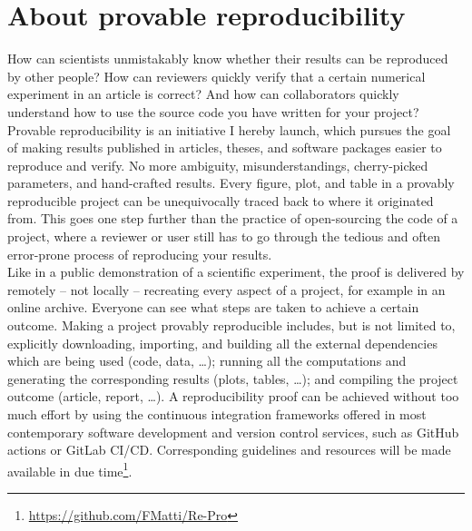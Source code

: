 \chapter*{About provable reproducibility}
\label{chp:0-reproducibility}

How can scientists unmistakably know whether their results can be reproduced
by other people? How can reviewers quickly verify that a certain numerical
experiment in an article is correct? And how can collaborators quickly
understand how to use the source code you have written for your project?\\

Provable reproducibility is an initiative I hereby launch, which pursues the
goal of making results published in articles, theses, and software packages easier to
reproduce and verify. No more ambiguity, misunderstandings, cherry-picked
parameters, and hand-crafted results. Every figure, plot, and table
in a provably reproducible project can be unequivocally traced back to where
it originated from. This goes one step further than the practice of open-sourcing
the code of a project, where a reviewer or user still has to go through the
tedious and often error-prone process of reproducing your results.\\

Like in a public demonstration of a scientific experiment, the proof is delivered
by remotely -- not locally -- recreating every aspect of a project, for example
in an online archive. Everyone can see what steps are taken to achieve a certain outcome.
Making a project provably reproducible includes, but is not limited to,
explicitly downloading, importing, and building all the external dependencies which are being used (code, data, \dots);
running all the computations and generating the corresponding results (plots, tables, \dots);
and compiling the project outcome (article, report, \dots).
A reproducibility proof can be achieved without too much effort by
using the continuous integration frameworks offered in most contemporary
software development and version control services, such as GitHub actions or
GitLab CI/CD. Corresponding guidelines and resources will be made available in due
time\footnote{\url{https://github.com/FMatti/Re-Pro}}.

\begin{center}
    
\end{center}
